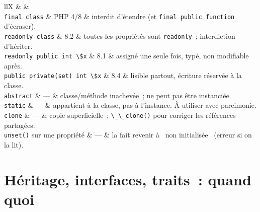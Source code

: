 \begin{tabz}{llX}
  \headrow {} \&  \&  \\
  \midrule
  \verb|final class| \& PHP 4/8 \& interdit d'\'etendre (et \verb|final public function| d'\'ecraser). \\
  \verb|readonly class| \& 8.2 \& toutes les propri\'et\'es sont \verb|readonly|~; interdiction d'h\'eriter. \\
  \verb|readonly public int \$x| \& 8.1 \& assign\'e une seule fois, typ\'e, non modifiable apr\`es. \\
  \verb|public private(set) int \$x| \& 8.4 \& lisible partout, \'ecriture r\'eserv\'ee \`a la classe. \\
  \verb|abstract| \& --- \& classe/m\'ethode inachev\'ee~; ne peut pas \^etre instanci\'ee. \\
  \verb|static| \& --- \& appartient \`a la classe, pas \`a l'instance. \`A utiliser avec parcimonie. \\
  \verb|clone| \& --- \& copie superficielle~; \verb|\_\_clone()| pour corriger les r\'ef\'erences partag\'ees. \\
  \verb|unset()| sur une propri\'et\'e \& --- \& la fait revenir \`a \og ~non initialis\'ee~ \fg{} (erreur si on la lit). \\
\end{tabz}

\section{H\'eritage, interfaces, traits~: quand quoi}

